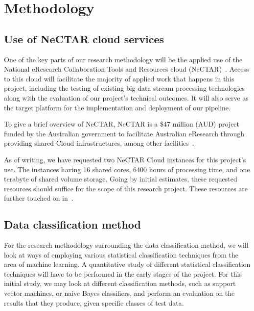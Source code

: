 \documentclass[a4paper,11pt]{article}
\begin{document}




\section{Methodology} %
\label{sec:methodology}

\subsection{Use of NeCTAR cloud services} %
\label{sub:use_of_nectar_cloud_services}

One of the key parts of our research methodology will be the applied use of the National eResearch Collaboration Tools
and Resources cloud (NeCTAR)~\cite{web:Nectar}. Access to this cloud will facilitate the majority of applied work that
happens in this project, including the testing of existing big data stream processing technologies along with the
evaluation of our project's technical outcomes. It will also serve as the target platform for the implementation and
deployment of our pipeline.

To give a brief overview of NeCTAR, NeCTAR is a \$47 million (AUD) project funded by the Australian government to
facilitate Australian eResearch through providing shared Cloud infrastructures, among other
facilities~\cite{sinnott_towards_2011}.

As of writing, we have requested two NeCTAR Cloud instances for this project's use. The instances having 16 shared
cores, 6400 hours of processing time, and one terabyte of shared volume storage. Going by initial estimates, these
requested resources should suffice for the scope of this research project. These resources are further touched on
in~.


\subsection{Data classification method} %
\label{sub:data_classification_method}

For the research methodology surrounding the data classification method, we will look at ways of employing various
statistical classification techniques from the area of machine learning. A quantitative study of different statistical
classification techniques will have to be performed in the early stages of the project. For this initial study, we may
look at different classification methods, such as support vector machines, or naive Bayes classifiers, and perform an
evaluation on the results that they produce, given specific classes of test data.
\end{document}
